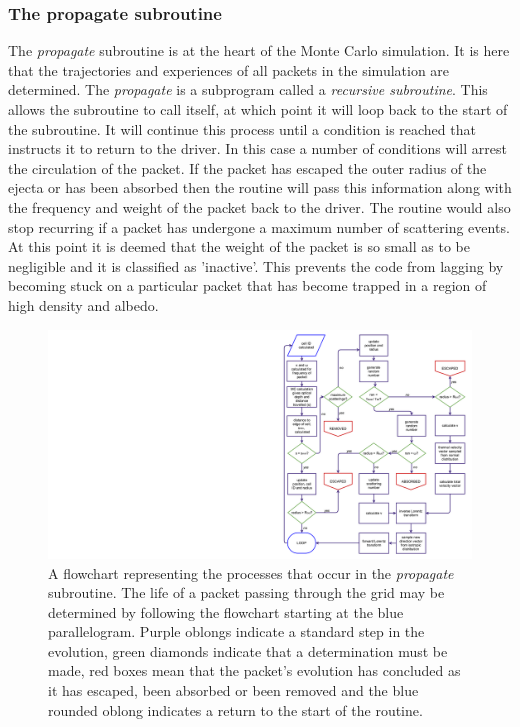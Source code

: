 		\subsubsection{The propagate subroutine}
		The \textit{propagate} subroutine is at the heart of the Monte Carlo simulation.  It is here that the trajectories and experiences of all packets in the simulation are determined.  The \textit{propagate} is a subprogram called a \textit{recursive subroutine}.  This allows the subroutine to call itself, at which point it will loop back to the start of the subroutine.  It will continue this process until a condition is reached that instructs it to return to the driver.  In this case a number of conditions will arrest the circulation of the packet. If the packet has escaped the outer radius of the ejecta or has been absorbed then the routine will pass this information along with the frequency and weight of the packet back to the driver.  The routine would also stop recurring if a packet has undergone a maximum number of scattering events.  At this point it is deemed that the weight of the packet is so small as to be negligible and it is classified as 'inactive'.  This prevents the code from lagging by becoming stuck on a particular packet that has become trapped in a region of high density and albedo. 
		
		\begin{centering}
            	\begin{figure}
            	\includegraphics[scale=0.165, trim=1180mm -20mm 28mm -20mm]{chapters/chapter2/propagate_module.png}
            	\caption[A flowchart representing the processes that occur in the \textit{propagate} subroutine]{A flowchart representing the processes that occur in the \textit{propagate} subroutine.  The life of a packet passing through the grid may be determined by following the flowchart starting at the blue parallelogram.  Purple oblongs indicate a standard step in the evolution, green diamonds indicate that a determination must be made, red boxes mean that the packet's evolution has concluded as it has escaped, been absorbed or been removed and the blue rounded oblong indicates a return to the start of the routine.}
            	\label{fig:flowchart_propagate}
            	\end{figure}
            	\end{centering}
		
